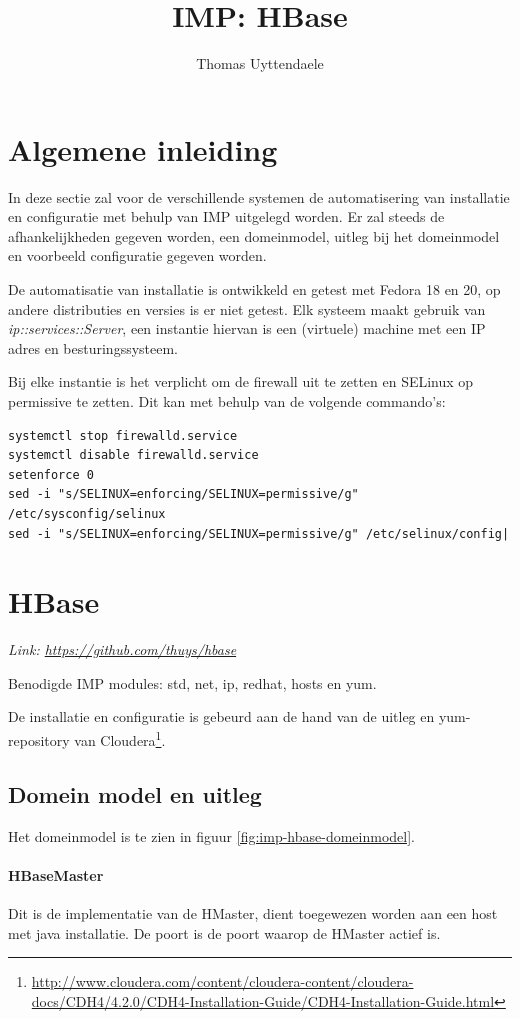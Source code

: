 \documentclass[]{article}
\title{IMP: HBase}
\author{Thomas Uyttendaele}
\begin{document}
\maketitle

\section{Algemene inleiding}
In deze sectie zal voor de verschillende systemen de automatisering van installatie en configuratie met behulp van IMP uitgelegd worden. Er zal steeds de afhankelijkheden gegeven worden, een domeinmodel, uitleg bij het domeinmodel en voorbeeld configuratie gegeven worden. 

De automatisatie van installatie is ontwikkeld en getest met Fedora 18 en 20, op andere distributies en versies is er niet getest. 
Elk systeem maakt gebruik van \textit{ip::services::Server}, een instantie hiervan is een (virtuele) machine met een IP adres en besturingssysteem. 

Bij elke instantie is het verplicht om de firewall uit te zetten en SELinux op permissive te zetten. Dit kan met behulp van de volgende commando's: 
\begin{lstlisting}[frame=single, breaklines=true]
systemctl stop firewalld.service  
systemctl disable firewalld.service  
setenforce 0
sed -i "s/SELINUX=enforcing/SELINUX=permissive/g" /etc/sysconfig/selinux
sed -i "s/SELINUX=enforcing/SELINUX=permissive/g" /etc/selinux/config|
\end{lstlisting}

\section{HBase}
\textit{Link: \url{https://github.com/thuys/hbase}}

Benodigde IMP modules: std, net, ip, redhat, hosts en yum. 

De installatie en configuratie is gebeurd aan de hand van de uitleg en yum-repository van Cloudera\footnote{\url{http://www.cloudera.com/content/cloudera-content/cloudera-docs/CDH4/4.2.0/CDH4-Installation-Guide/CDH4-Installation-Guide.html}}. 

\subsection{Domein model en uitleg}
Het domeinmodel is te zien in figuur \ref{fig:imp-hbase-domeinmodel}.

\paragraph{HBaseMaster} Dit is de implementatie van de HMaster, dient toegewezen worden aan een host met java installatie. De poort is de poort waarop de HMaster actief is. 
 
\end{document}
